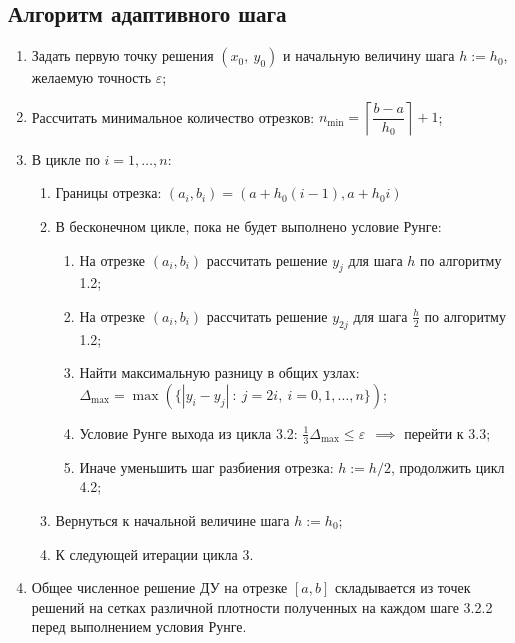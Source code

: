 \subsection{Алгоритм адаптивного шага}

\begin{enumerate}
    \item Задать первую точку решения $(x_0,~y_0)$ и начальную величину шага $h:=h_0$, желаемую точность $\varepsilon$;

    \item Рассчитать минимальное количество отрезков: $n_{\min} = \left\lceil \dfrac{b-a}{h_0} \right\rceil + 1$;


    \item В цикле по $i=1,\ldots,n$:
    \begin{enumerate}
        \item Границы отрезка: $(a_i, b_i) = (a+h_0(i-1), a+h_0i)$
        \item В бесконечном цикле, пока не будет выполнено условие Рунге:
        \begin{enumerate}
            \item На отрезке $(a_i, b_i)$ рассчитать решение $y_{j}$ для шага $h$ по алгоритму 1.2;

            \item На отрезке $(a_i, b_i)$ рассчитать решение $y_{2j}$ для шага $\frac{h}{2}$ по алгоритму 1.2;

            \item Найти максимальную разницу в общих узлах: $\Delta_{\max} = \max(\{|y_i-y_j|~:~j=2i,~i=0,1,\ldots,n\})$;

            \item Условие Рунге выхода из цикла 3.2: $\frac{1}{3} \Delta_{\max} \le \varepsilon ~~ \implies$ перейти к 3.3;

            \item Иначе уменьшить шаг разбиения отрезка: $h:=h/2$, продолжить цикл 4.2;
        \end{enumerate}

        \item Вернуться к начальной величине шага $h:=h_0$;
        \item К следующей итерации цикла 3.
    \end{enumerate}

    \item Общее численное решение ДУ на отрезке $[a,b]$ складывается из точек решений на сетках различной плотности полученных на каждом шаге 3.2.2 перед выполнением условия Рунге.


\end{enumerate}